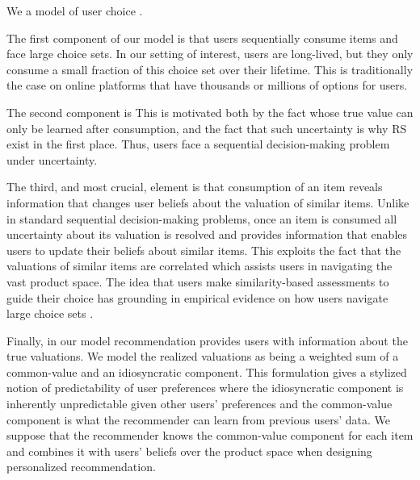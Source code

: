\documentclass[manuscript]{acmart}
\newcommand{\xhdr}[1]{\vspace{1mm} \noindent{\bf #1}}
\begin{document}
\xhdr{Our Model\dgedit{.}} We  a model of user choice .
\par
The first component of our model is that users sequentially consume items and face large choice sets. In our setting of interest, users are long-lived, but they only consume a small fraction of this choice set over their lifetime. This is traditionally the case on online platforms that have thousands or millions of options for users.
\par
The second component is
This is motivated both by the fact  whose true value can only be learned after consumption, and the fact that such uncertainty is why RS exist in the first place. Thus, users face a sequential decision-making problem under uncertainty.
\par 
The third, and most crucial, element is that consumption of an item reveals information that changes user beliefs about the valuation of similar items. Unlike in standard sequential decision-making problems, once an item is consumed all uncertainty about its valuation is resolved and provides information that enables users to update their beliefs about similar items. This exploits the fact that the valuations of similar items are correlated which assists users in navigating the vast product space. The idea that users make similarity-based assessments to guide their choice has grounding in  empirical evidence on how users navigate large choice sets \cite{schulz2019structured}.
\par 
Finally, in our model recommendation provides users with information about the true valuations. We model the realized valuations as being a weighted sum of a common-value and an idiosyncratic component. This formulation gives a stylized notion of predictability of user preferences where the idiosyncratic component is inherently unpredictable given other users' preferences and the common-value component is what the recommender can learn from previous users' data. We suppose that the recommender knows the common-value component for each item and combines it with users' beliefs over the product space when designing personalized recommendation.
\end{document}
